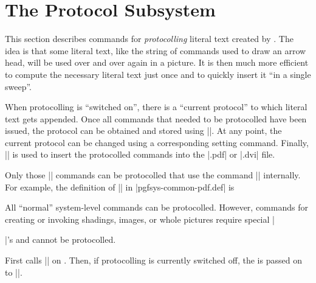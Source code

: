 %
%
%


\section[pgfsys-protocol]{The Protocol Subsystem}
\label{section-protocols}

\makeatletter

This section describes commands for \emph{protocolling} literal text created by
\pgfname. The idea is that some literal text, like the string of commands used
to draw an arrow head, will be used over and over again in a picture. It is
then much more efficient to compute the necessary literal text just once and to
quickly insert it ``in a single sweep''.

When protocolling is ``switched on'', there is a ``current protocol'' to which
literal text gets appended. Once all commands that needed to be protocolled
have been issued, the protocol can be obtained and stored using
|\pgfsysprotocol@getcurrentprotocol|. At any point, the current protocol can be
changed using a corresponding setting command. Finally,
|\pgfsysprotocol@invokecurrentprotocol| is used to insert the protocolled
commands into the |.pdf| or |.dvi| file.

Only those |\pgfsys@| commands can be protocolled that use the command
|\pgfsysprotocol@literal| internally. For example, the definition of
|\pgfsys@moveto| in |pgfsys-common-pdf.def| is
%
\begin{codeexample}
\def\pgfsys@moveto#1#2{\pgfsysprotocol@literal{#1 #2 m}}
\end{codeexample}
%
All ``normal'' system-level commands can be protocolled. However, commands for
creating or invoking shadings, images, or whole pictures require special
|\special|'s and cannot be protocolled.


\begin{command}{\pgfsysprotocol@literal{}}
    First calls |\pgfsysprotocol@literalbuffered| on . Then,
    if protocolling is currently switched off, the  is
    passed on to |\pgfsys@invoke|.
\end{command}

